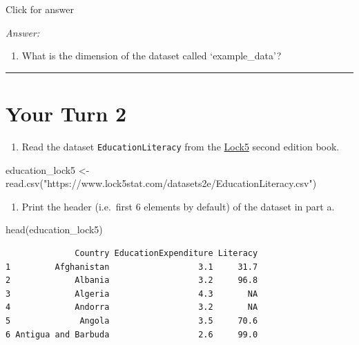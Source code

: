 \documentclass[
]{book}
\newenvironment{Shaded}{\begin{snugshade}}{\end{snugshade}}
\newcommand{\FunctionTok}[1]{\textcolor[rgb]{0.00,0.00,0.00}{#1}}
\newcommand{\NormalTok}[1]{#1}
\newcommand{\OtherTok}[1]{\textcolor[rgb]{0.56,0.35,0.01}{#1}}
\newcommand{\StringTok}[1]{\textcolor[rgb]{0.31,0.60,0.02}{#1}}
\providecommand{\tightlist}{%
  \setlength{\itemsep}{0pt}\setlength{\parskip}{0pt}}
\begin{document}
Click for answer

\emph{Answer:}

\vspace*{1in}

\begin{enumerate}
\def\labelenumi{\alph{enumi}.}
\setcounter{enumi}{1}
\tightlist
\item
  What is the dimension of the dataset called `example\_data'?
\end{enumerate}

\vspace*{1in}

\begin{center}\rule{0.5\linewidth}{0.5pt}\end{center}

\hypertarget{your-turn-2}{%
\chapter{Your Turn 2}\label{your-turn-2}}

\begin{enumerate}
\def\labelenumi{\alph{enumi}.}
\tightlist
\item
  Read the dataset \texttt{EducationLiteracy} from the \href{https://www.lock5stat.com/datapage2e.html}{Lock5} second edition book.
\end{enumerate}

\begin{Shaded}
\begin{Highlighting}[]
\NormalTok{education\_lock5 }\OtherTok{\textless{}{-}} \FunctionTok{read.csv}\NormalTok{(}\StringTok{"https://www.lock5stat.com/datasets2e/EducationLiteracy.csv"}\NormalTok{)}
\end{Highlighting}
\end{Shaded}

\begin{enumerate}
\def\labelenumi{\alph{enumi}.}
\setcounter{enumi}{1}
\tightlist
\item
  Print the header (i.e.~first 6 elements by default) of the dataset in part a.
\end{enumerate}

\begin{Shaded}
\begin{Highlighting}[]
\FunctionTok{head}\NormalTok{(education\_lock5)}
\end{Highlighting}
\end{Shaded}

\begin{verbatim}
              Country EducationExpenditure Literacy
1         Afghanistan                  3.1     31.7
2             Albania                  3.2     96.8
3             Algeria                  4.3       NA
4             Andorra                  3.2       NA
5              Angola                  3.5     70.6
6 Antigua and Barbuda                  2.6     99.0
\end{verbatim}
\end{document}
